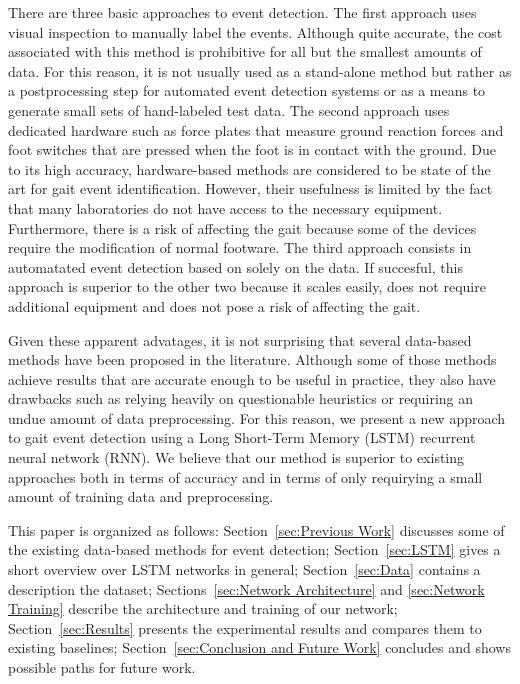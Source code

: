 \documentclass{acm_proc_article-sp}
\begin{document}

There are three basic approaches to event detection.
The first approach uses visual inspection to manually label the events.
Although quite accurate, the cost associated with this method is prohibitive for
all but the smallest amounts of data.
For this reason, it is not usually used as a stand-alone method but rather as a 
postprocessing step for automated event detection systems or as a means to 
generate small sets of hand-labeled test data.
The second approach uses dedicated hardware such as force plates that measure
ground reaction forces and foot switches that are pressed when the foot is in
contact with the ground.
Due to its high accuracy, hardware-based methods are considered to be
state of the art for gait event identification.
However, their usefulness is limited by the fact that many laboratories do not
have access to the necessary equipment.
Furthermore, there is a risk of affecting the gait because some of the devices
require the modification of normal footware.
The third approach consists in automatated event detection based on solely on
the data.
If succesful, this approach is superior to the other two because it scales 
easily, does not require additional equipment and does not pose a risk of 
affecting the gait.

Given these apparent advatages, it is not surprising that several data-based 
methods have been proposed in the literature.
Although some of those methods achieve results that are accurate enough to be 
useful in practice, they also have drawbacks such as relying heavily on 
questionable heuristics or requiring an undue amount of data preprocessing.
For this reason, we present a new approach to gait event detection using a
Long Short-Term Memory (LSTM) recurrent neural network (RNN).
We believe that our method is superior to existing approaches both in terms of 
accuracy and in terms of only requirying a small amount of training data and 
preprocessing.

This paper is organized as follows:
Section~\ref{sec:Previous Work}
discusses some of the existing data-based methods for event detection;
Section~\ref{sec:LSTM}
gives a short overview over LSTM networks in general;
Section~\ref{sec:Data}
contains a description the dataset;
Sections~\ref{sec:Network Architecture} and \ref{sec:Network Training}
describe the architecture and training of our network;
Section~\ref{sec:Results}
presents the experimental results and compares them to existing baselines;
Section~\ref{sec:Conclusion and Future Work}
concludes and shows possible paths for future work.
\end{document}
